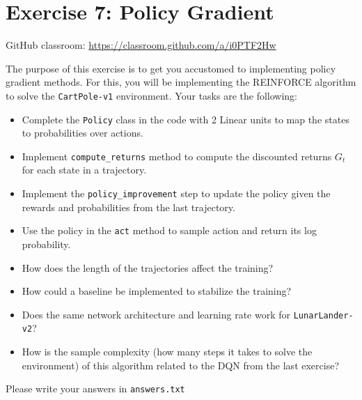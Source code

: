 \documentclass{exam}
\begin{document}
\section*{Exercise 7: Policy Gradient}
GitHub classroom: \url{https://classroom.github.com/a/i0PTF2Hw}

\noindent 
The purpose of this exercise is to get you accustomed to implementing policy gradient methods. For this, you will be implementing the REINFORCE algorithm to solve the \texttt{CartPole-v1} environment. Your tasks are the following:

\begin{questions}
	\indent
	\begin{itemize}
		\item Complete the \texttt{Policy} class in the code with 2 Linear units to map the states to probabilities over actions.
		\item Implement \texttt{compute\_returns} method to compute the discounted returns $G_t$ for each state in a trajectory.
		\item Implement the \texttt{policy\_improvement} step to update the policy given the rewards and probabilities from the last trajectory.
		\item Use the policy in the \texttt{act} method to sample action and return its log probability.
	\end{itemize}	
	\indent
	\begin{itemize}
		\item How does the length of the trajectories affect the training?
		\item How could a baseline be implemented to stabilize the training?
		\item Does the same network architecture and learning rate work for \texttt{LunarLander-v2}?
		\item How is the sample complexity (how many steps it takes to solve the environment) of this algorithm related to the DQN from the last exercise?
	\end{itemize}

\end{questions}

\noindent 
Please write your answers in \texttt{answers.txt}
\end{document}
